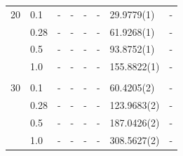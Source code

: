\begin{table} [H]
\begin{tabularx}{\textwidth}{l:l|XXXXXX}
		20 & 0.1 & - & - & - & - & 29.9779(1) & - \\ 
		& 0.28 & - & - & - & - & 61.9268(1) & - \\
		& 0.5 & - & - & - & - & 93.8752(1) & - \\
		& 1.0 & - & - & - & - & 155.8822(1) & - \\ \hdashline \\
		
		30 & 0.1 & - & - & - & - & 60.4205(2) & -\\ 
		& 0.28 & - & - & - & - & 123.9683(2) & - \\
		& 0.5 & - & - & - & - & 187.0426(2) & -\\
		& 1.0 & - & - & - & - & 308.5627(2) & -\\ \hline\hline
	\end{tabularx}
\end{table}

